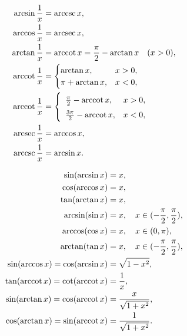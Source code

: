 \begin{theorem}[倒数关系]
\begin{align}
\arcsin\frac{1}{x} &= \arccsc x, \\
\arccos\frac{1}{x} &= \arcsec x, \\
\arctan\frac{1}{x} &= \arccot x
	= \frac{\pi}{2} - \arctan x
 \quad(x>0), \\
\arccot\frac{1}{x} &= \begin{cases}
	\arctan x, & x>0, \\
	\pi+\arctan x, & x<0,
	\end{cases} \\
\arccot\frac{1}{x} &= \left\{ \def\arraystretch{1.5} \begin{array}{lc}
	\frac{\pi}{2} - \arccot x, & x>0, \\
	\frac{3\pi}{2} - \arccot x, & x<0,
	\end{array} \right. \\
\arcsec\frac{1}{x} &= \arccos x, \\
\arccsc\frac{1}{x} &= \arcsin x.
\end{align}
\end{theorem}

\begin{theorem}[三角关系]
\begin{align}
\sin(\arcsin{x}) &= x, \\
\cos(\arccos{x}) &= x, \\
\tan(\arctan{x}) &= x, \\
\arcsin(\sin x) &= x, \quad x \in (-\frac{\pi}{2},\frac{\pi}{2}), \\
\arccos(\cos x) &= x, \quad x \in (0,\pi), \\
\arctan(\tan x) &= x, \quad x \in (-\frac{\pi}{2},\frac{\pi}{2}), \\
\sin(\arccos{x}) = \cos(\arcsin{x}) &= \sqrt{1 - x^2}, \\
\tan(\arccot{x}) = \cot(\arccot{x}) &= \frac{1}{x}, \\
\sin(\arctan{x}) = \cos(\arccot{x}) &= \frac{x}{\sqrt{1+x^2}}, \\
\cos(\arctan{x}) = \sin(\arccot{x}) &= \frac{1}{\sqrt{1+x^2}}.
\end{align}
\end{theorem}

